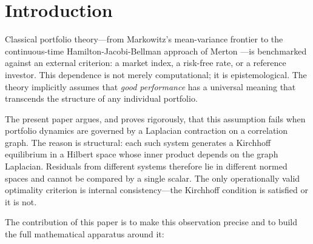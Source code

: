 \documentclass[twocolumn,11pt,a4paper]{article}
\theoremstyle{plain}
\theoremstyle{definition}
\theoremstyle{remark}
\begin{document}
\section{Introduction}
\label{sec:intro}

Classical portfolio theory---from Markowitz's mean-variance frontier
\cite{Markowitz1952} to the continuous-time Hamilton-Jacobi-Bellman
approach of Merton \cite{Merton1969}---is benchmarked against an
external criterion: a market index, a risk-free rate, or a reference
investor.  This dependence is not merely computational; it is
epistemological.  The theory implicitly assumes that \emph{good
performance} has a universal meaning that transcends the structure of
any individual portfolio.

The present paper argues, and proves rigorously, that this assumption
fails when portfolio dynamics are governed by a Laplacian contraction on
a correlation graph.  The reason is structural: each such system
generates a Kirchhoff equilibrium in a Hilbert space whose inner product
depends on the graph Laplacian.  Residuals from different systems
therefore lie in different normed spaces and cannot be compared by a
single scalar.  The only operationally valid optimality criterion is
internal consistency---the Kirchhoff condition is satisfied or it is not.

The contribution of this paper is to make this observation precise and
to build the full mathematical apparatus around it:
\end{document}
